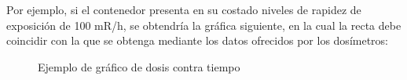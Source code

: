 Por ejemplo, si el contenedor presenta en su costado niveles de rapidez de exposición de 100 mR/h, se obtendría la gráfica siguiente, en la cual la recta debe coincidir con la que se obtenga mediante los datos ofrecidos por los dosímetros:

\begin{figure}[h]
    \centering
    \caption{Ejemplo de gráfico de dosis contra tiempo}
\end{figure}

